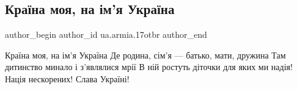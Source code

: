  
 
 
 
 

\subsection{Країна моя, на ім'я Україна}
\label{sec:31_12_2022.fb.ua.armia.17otbr.1.kra_na_moya__na__m_y}

\ifcmt
 author_begin
   author_id ua.armia.17otbr
 author_end
\fi

\obeycr
Країна моя, на ім'я Україна 
Де родина, сім'я — батько, мати, дружина
Там дитинство минало і з'являлися мрії
В ній ростуть діточки для яких ми надія!
Нація нескорених!
Слава Україні!
\restorecr
